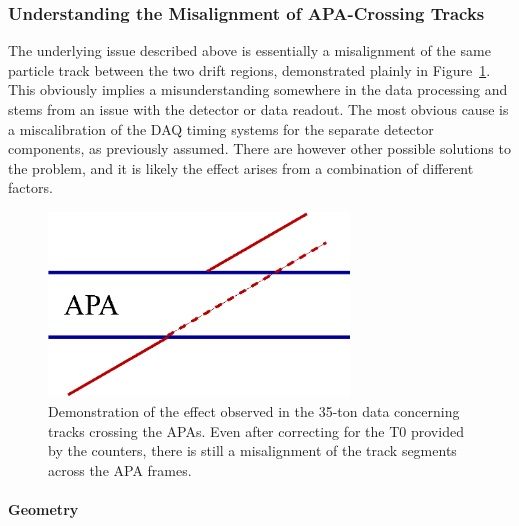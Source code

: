 
\subsubsection{Understanding the Misalignment of APA-Crossing Tracks}\label{sec:APACrossingMisalignment}

The underlying issue described above is essentially a misalignment of the same particle track between the two drift regions, demonstrated plainly in Figure~\ref{fig:TrackMisalignment}.  This obviously implies a misunderstanding somewhere in the data processing and stems from an issue with the detector or data readout.  The most obvious cause is a miscalibration of the DAQ timing systems for the separate detector components, as previously assumed.  There are however other possible solutions to the problem, and it is likely the effect arises from a combination of different factors.

\begin{figure}
  \centering
  \includegraphics[width=8cm]{misalign_track_geo.eps}
  \caption[Demonstration of the effect observed in the 35-ton data concerning tracks crossing the APAs.]{Demonstration of the effect observed in the 35-ton data concerning tracks crossing the APAs.  Even after correcting for the T0 provided by the counters, there is still a misalignment of the track segments across the APA frames.}
  \label{fig:TrackMisalignment}
\end{figure}

\paragraph{Geometry}

